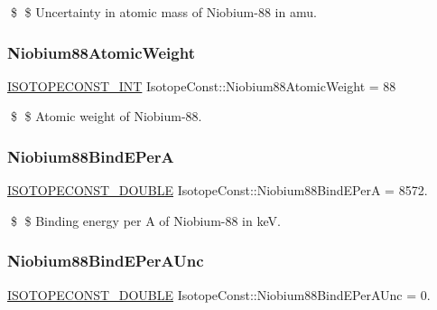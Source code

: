 \$ \$ Uncertainty in atomic mass of Niobium-\/88 in amu. \mbox{\label{group___isotope_const-_niobium-_nb88_gae45e26972fdbc91314e0d117edb28a58}} 
\subsubsection{\texorpdfstring{Niobium88\+Atomic\+Weight}{Niobium88AtomicWeight}}
{\footnotesize\ttfamily \mbox{\hyperlink{group___isotope_const-_macros_ga5f18360b3e99483a35c32d789e62621c}{I\+S\+O\+T\+O\+P\+E\+C\+O\+N\+S\+T\+\_\+\+I\+NT}} Isotope\+Const\+::\+Niobium88\+Atomic\+Weight = 88}

\$ \$ Atomic weight of Niobium-\/88. \mbox{\label{group___isotope_const-_niobium-_nb88_ga12f14da188d1f93d73be2caff7f74217}} 
\subsubsection{\texorpdfstring{Niobium88\+Bind\+E\+PerA}{Niobium88BindEPerA}}
{\footnotesize\ttfamily \mbox{\hyperlink{group___isotope_const-_macros_ga8f45a7272ce02c0b4c65c44636ed719a}{I\+S\+O\+T\+O\+P\+E\+C\+O\+N\+S\+T\+\_\+\+D\+O\+U\+B\+LE}} Isotope\+Const\+::\+Niobium88\+Bind\+E\+PerA = 8572.}

\$ \$ Binding energy per A of Niobium-\/88 in keV. \mbox{\label{group___isotope_const-_niobium-_nb88_ga597caf17ae62e96e079217207c5a01d2}} 
\subsubsection{\texorpdfstring{Niobium88\+Bind\+E\+Per\+A\+Unc}{Niobium88BindEPerAUnc}}
{\footnotesize\ttfamily \mbox{\hyperlink{group___isotope_const-_macros_ga8f45a7272ce02c0b4c65c44636ed719a}{I\+S\+O\+T\+O\+P\+E\+C\+O\+N\+S\+T\+\_\+\+D\+O\+U\+B\+LE}} Isotope\+Const\+::\+Niobium88\+Bind\+E\+Per\+A\+Unc = 0.}

